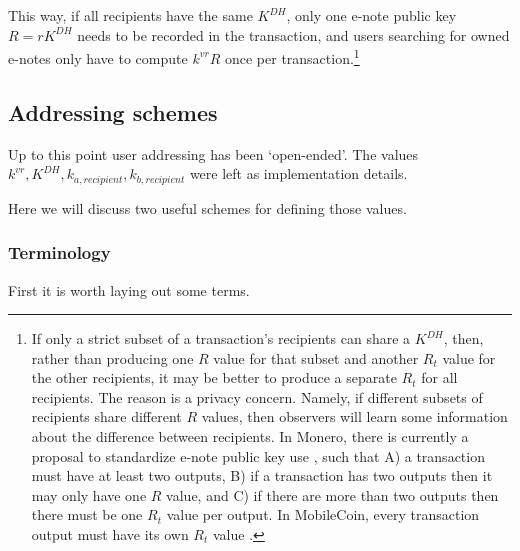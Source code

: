 \begin{itemize}
    This way, if all recipients have the same $K^{DH}$, only one e-note public key $R = r K^{DH}$ needs to be recorded in the transaction, and users searching for owned e-notes only have to compute $k^{vr} R$ once per transaction.\footnote{If only a strict subset of a transaction's recipients can share a $K^{DH}$, then, rather than producing one $R$ value for that subset and another $R_t$ value for the other recipients, it may be better to produce a separate $R_t$ for all recipients. The reason is a privacy concern. Namely, if different subsets of recipients share different $R$ values, then observers will learn some information about the difference between recipients. In Monero, there is currently a proposal to standardize e-note public key use \cite{update-tx-supplement-proposal-monero}, such that A) a transaction must have at least two outputs, B) if a transaction has two outputs then it may only have one $R$ value, and C) if there are more than two outputs then there must be one $R_t$ value per output. In MobileCoin, every transaction output must have its own $R_t$ value \cite{mom-1}.}
\end{itemize}


\subsection{Addressing schemes}
\label{subsec:implementers-addressing-schemes}

Up to this point user addressing has been `open-ended'. The values $k^{vr}, K^{DH}, k_{a,recipient}, k_{b,recipient}$ were left as implementation details.

Here we will discuss two useful schemes for defining those values.

\subsubsection{Terminology}

First it is worth laying out some terms.

